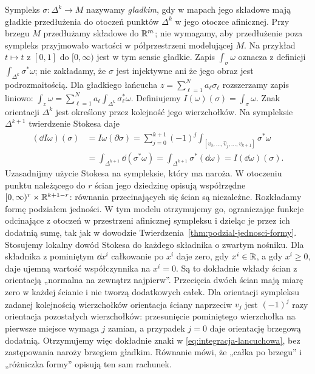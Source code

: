 Sympleks $\sigma:\Delta^k\to M$ nazywamy \emph{gładkim},
gdy w mapach jego składowe mają gładkie przedłużenia
do otoczeń punktów $\Delta^k$ w jego otoczce afinicznej.
Przy brzegu $M$ przedłużamy składowe do $\mathbb{R}^m$;
nie wymagamy, aby przedłużenie poza sympleks przyjmowało
wartości w półprzestrzeni modelującej $M$.
Na przykład $t\mapsto t$ z $[0,1]$ do $[0,\infty)$
jest w tym sensie gładkie. Zapis
$\int_\sigma\omega$ oznacza z definicji
$\int_{\Delta^k}\sigma^*\omega$; nie zakładamy, że $\sigma$
jest injektywne ani że jego obraz jest podrozmaitością.
Dla gładkiego łańcucha $z=\sum_{\ell=1}^N a_\ell\sigma_\ell$
rozszerzamy zapis liniowo:
$\int_z\omega=\sum_{\ell=1}^N a_\ell
\int_{\Delta^k}\sigma_\ell^*\omega$.
Definiujemy $I(\omega)(\sigma)=\int_\sigma\omega$.
Znak orientacji $\Delta^k$ jest określony przez
kolejność jego wierzchołków. Na sympleksie
$\Delta^{k+1}$ twierdzenie Stokesa daje
\begin{equation}\label{eq:integracja-lancuchowa}
 \begin{aligned}
 (\dd I\omega)(\sigma)
 &= I\omega(\partial\sigma)
  =\sum_{j=0}^{k+1}(-1)^j
      \int_{[v_0,\ldots,\widehat v_j,\ldots,v_{k+1}]}
          \sigma^*\omega \\
 &=\int_{\Delta^{k+1}}\dd(\sigma^*\omega)
  =\int_{\Delta^{k+1}}\sigma^*(\dd\omega)
  =I(\dd\omega)(\sigma).
 \end{aligned}
\end{equation}
Uzasadnijmy użycie Stokesa na sympleksie, który ma naroża.
W otoczeniu punktu należącego do $r$ ścian jego dziedzinę
opisują współrzędne
$[0,\infty)^r\times\mathbb{R}^{k+1-r}$: równania przecinających
się ścian są niezależne. Rozkładamy formę podziałem
jedności. W tym modelu otrzymujemy go, ograniczając
funkcje odcinające z otoczeń w przestrzeni afinicznej
sympleksu i dzieląc je przez ich dodatnią sumę,
tak jak w dowodzie Twierdzenia~\ref{thm:podzial-jednosci-formy}.
Stosujemy lokalny dowód Stokesa do każdego
składnika o zwartym nośniku. Dla składnika z pominiętym
$\dd x^i$ całkowanie po $x^i$ daje zero, gdy $x^i\in\mathbb{R}$,
a gdy $x^i\geq0$, daje ujemną wartość współczynnika
na $x^i=0$. Są to dokładnie wkłady ścian z orientacją
„normalna na zewnątrz najpierw”. Przecięcia dwóch ścian
mają miarę zero w każdej ścianie i nie tworzą dodatkowych
całek. Dla orientacji sympleksu zadanej kolejnością
wierzchołków orientacja ściany naprzeciw $v_j$ jest
$(-1)^j$ razy orientacja pozostałych wierzchołków:
przesunięcie pominiętego wierzchołka na pierwsze miejsce
wymaga $j$ zamian, a przypadek $j=0$ daje orientację
brzegową dodatnią. Otrzymujemy więc dokładnie znaki
w \eqref{eq:integracja-lancuchowa}, bez zastępowania
naroży brzegiem gładkim.
Równanie mówi, że „całka po brzegu” i „różniczka
formy” opisują ten sam rachunek.

